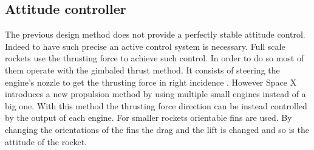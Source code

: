 \subsection{Attitude controller}
The previous design method does not provide a perfectly stable attitude control. Indeed to have such precise an active control system is necessary. Full scale rockets use the thrusting force to achieve such control. In order to do so most of them operate with the gimbaled thrust method. It consists of steering the engine's nozzle to get the thrusting force in right incidence \cite{web:rocketnasa}. However Space X introduces a new propulsion method by using multiple small engines instead of a big one. With this method the thrusting force direction can be instead controlled by the output of each engine. For smaller rockets orientable fins are used. By changing the orientations of the fins the drag and the lift is changed and so is the attitude of the rocket.